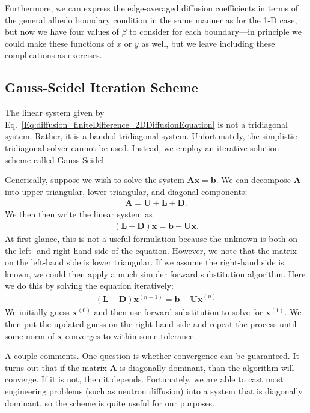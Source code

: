 Furthermore, we can express the edge-averaged diffusion coefficients in terms of the general albedo boundary condition in the same manner as for the 1-D case, but now we have four values of $\beta$ to consider for each boundary---in principle we could make these functions of $x$ or $y$ as well, but we leave including these complications as exercises.




\subsection{Gauss-Seidel Iteration Scheme}

The linear system given by Eq.~\eqref{Eq:diffusion_finiteDifference_2DDiffusionEquation} is not a tridiagonal system. Rather, it is a banded tridiagonal system. Unfortunately, the simplistic tridiagonal solver cannot be used. Instead, we employ an iterative solution scheme called Gauss-Seidel.

Generically, suppose we wish to solve the system $\mathbf{Ax} = \mathbf{b}$. We can decompose $\mathbf{A}$ into upper triangular, lower triangular, and diagonal components:
\begin{align}
  \mathbf{A} = \mathbf{U} + \mathbf{L} + \mathbf{D} .
\end{align}
We then then write the linear system as
\begin{align}
  \left( \mathbf{L} + \mathbf{D} \right) \mathbf{x} = \mathbf{b} - \mathbf{U x } .
\end{align}
At first glance, this is not a useful formulation because the unknown is both on the left- and right-hand side of the equation. However, we note that the matrix on the left-hand side is lower triangular. If we assume the right-hand side is known, we could then apply a much simpler forward substitution algorithm. Here we do this by solving the equation iteratively:
\begin{align}
  \left( \mathbf{L} + \mathbf{D} \right) \mathbf{x}^{(n+1)} = \mathbf{b} - \mathbf{U x }^{(n)}
\end{align}
We initially guess $\mathbf{x}^{(0)}$ and then use forward substitution to solve for $\mathbf{x}^{(1)}$. We then put the updated guess on the right-hand side and repeat the process until some norm of $\mathbf{x}$ converges to within some tolerance.

A couple comments. One question is whether convergence can be guaranteed. It turns out that if the matrix $\mathbf{A}$ is diagonally dominant, than the algorithm will converge. If it is not, then it depends. Fortunately, we are able to cast most engineering problems (such as neutron diffusion) into a system that is diagonally dominant, so the scheme is quite useful for our purposes. 

